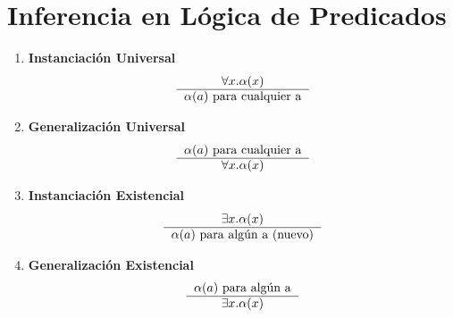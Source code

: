 \documentclass{article}
\begin{document}
\section{Inferencia en Lógica de Predicados}
\begin{enumerate}
    \item \textbf{Instanciación Universal}
    \[
        \begin{tabular}{c}
        $\forall{} x . \alpha{} (x)$ \\ \hline
        $\alpha{} (a)$ para cualquier a
        \end{tabular}
    \]
    \item \textbf{Generalización Universal}
    \[
        \begin{tabular}{c}
            $\alpha{} (a)$ para cualquier a \\ \hline
            $\forall{} x . \alpha{} (x)$
        \end{tabular}
    \]
    \item \textbf{Instanciación Existencial}
    \[
        \begin{tabular}{c}
        $\exists{} x . \alpha{} (x)$ \\ \hline
        $\alpha{} (a)$ para algún a (nuevo)
        \end{tabular}
    \]
    \item \textbf{Generalización Existencial}
    \[
        \begin{tabular}{c}
        $\alpha{} (a)$ para algún a\\ \hline
        $\exists{} x . \alpha{} (x)$
        \end{tabular}
    \]

\end{enumerate}
\end{document}
